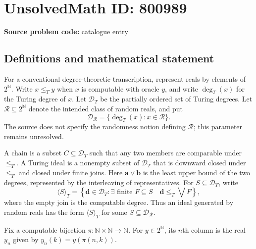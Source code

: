 \documentclass[11pt]{article}
\newcommand{\N}{\mathbb{N}}
\begin{document}
\section*{UnsolvedMath ID: 800989}
\textbf{Source problem code:} catalogue entry
\subsection{Definitions and mathematical statement}
For a conventional degree-theoretic transcription, represent reals by elements of $2^{\N}$. Write $x\leq_T y$ when $x$ is computable with oracle $y$, and write $\deg_T(x)$ for the Turing degree of $x$. Let $\mathcal D_T$ be the partially ordered set of Turing degrees. Let $\mathcal R\subseteq 2^{\N}$ denote the intended class of random reals, and put
\[
\mathcal D_{\mathcal R}=\{\deg_T(x):x\in\mathcal R\}.
\]
The source does not specify the randomness notion defining $\mathcal R$; this parameter remains unresolved.

A chain is a subset $C\subseteq\mathcal D_T$ such that any two members are comparable under $\leq_T$. A Turing ideal is a nonempty subset of $\mathcal D_T$ that is downward closed under $\leq_T$ and closed under finite joins. Here $\mathbf a\vee\mathbf b$ is the least upper bound of the two degrees, represented by the interleaving of representatives. For $S\subseteq\mathcal D_T$, write
\[
\langle S\rangle_T
=\left\{\mathbf d\in\mathcal D_T:
\exists\text{ finite }F\subseteq S\quad
\mathbf d\leq_T\bigvee F\right\},
\]
where the empty join is the computable degree. Thus an ideal generated by random reals has the form $\langle S\rangle_T$ for some $S\subseteq\mathcal D_{\mathcal R}$.

Fix a computable bijection $\pi:\N\times\N\to\N$. For $y\in2^{\N}$, its $n$th column is the real $y_n$ given by $y_n(k)=y(\pi(n,k))$.
\end{document}
